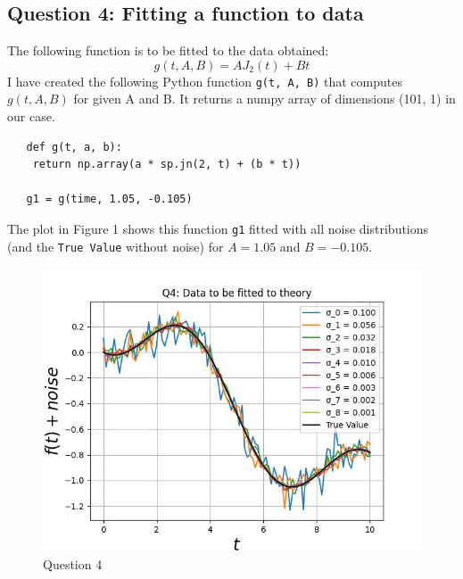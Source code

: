 \documentclass[11pt, a4paper]{article}
\begin{document}
  \subsection{Question 4: Fitting a function to data}
  The following function is to be fitted to the data obtained:
  $$g(t, A, B)=AJ_{2}(t)+Bt$$
  I have created the following Python function \texttt{g(t, A, B)} that computes $g(t, A, B)$ for given A and B. It returns a numpy array of dimensions (101, 1) in our case.
  \begin{verbatim}	
   def g(t, a, b):
    return np.array(a * sp.jn(2, t) + (b * t))
    
   g1 = g(time, 1.05, -0.105) 
  \end{verbatim}The plot in Figure 1 shows this function \texttt{g1} fitted with all noise distributions (and the \texttt{True Value} without noise) for $A=1.05$ and $B=-0.105$.
   \begin{figure}[!tbh]
   	\centering
   	\includegraphics[scale=0.5]{Q4.jpeg} 
	\caption{Question 4}
   	\label{fig:Q4}
   \end{figure}
  
\end{document}
